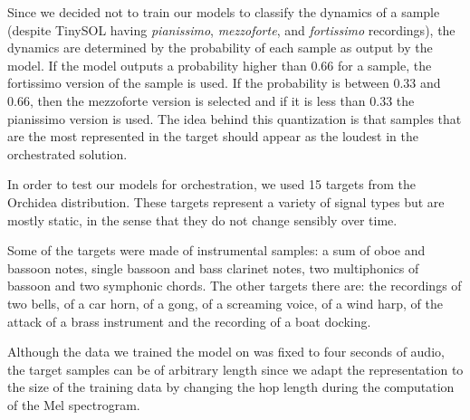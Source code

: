 \documentclass{article}
\begin{document}
Since we decided not to train our models to classify the dynamics of a sample (despite TinySOL having \emph{pianissimo}, \emph{mezzoforte}, and \emph{fortissimo} recordings), the dynamics are determined by the probability of each sample as output by the model. If the model outputs a probability higher than $0.66$ for a sample, the fortissimo version of the sample is used. If the probability is between $0.33$ and $0.66$, then the mezzoforte version is selected and if it is less than $0.33$ the pianissimo version is used. The idea behind this quantization is that samples that are the most represented in the target should appear as the loudest in the orchestrated solution.

In order to test our models for orchestration, we used 15 targets from the Orchidea distribution. These targets represent a variety of signal types but are mostly static, in the sense that they do not change sensibly over time.

Some of the targets were made of instrumental samples: a sum of oboe and bassoon notes, single bassoon and bass clarinet notes, two multiphonics of bassoon and two symphonic chords. The other targets there are: the recordings of two bells, of a car horn, of a gong, of a screaming voice, of a wind harp, of the attack of a brass instrument and the recording of a boat docking. 

Although the data we trained the model on was fixed to four seconds of audio, the target samples can be of arbitrary length since we adapt the representation to the size of the training data by changing the hop length during the computation of the Mel spectrogram.
\end{document}
